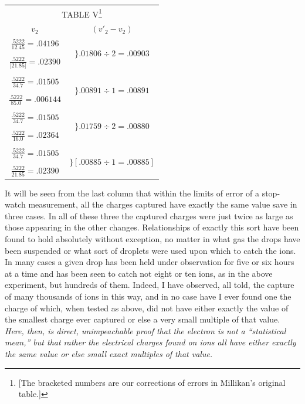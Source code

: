 \begin{table}[htp]
\centering
\begin{minipage}{\textwidth}
\centering
\begin{tabular}{ c c }
  \multicolumn{2}{c}{TABLE V\footnote{[The bracketed numbers are our corrections of errors
  in Millikan's original table.]}}\\[3pt]
  $v_2$ & $ (v'_2 - v_2)$\\[5pt]
  $\frac{.5222}{12.45} = .04196$ & \multirow{3}{*}{$\biggr\} .01806 \div 2 = .00903$}\\
  &\\
  $\frac{.5222}{{[}21.85{]}} = .02390$ & \multirow{3}{*}{$\biggr\} .00885 \div 1 = .00885$}\\
  &\\
  $\frac{.5222}{34.7} = .01505$ &\multirow{3}{*}{$\biggr\} .00891 \div 1 = .00891$}\\
  &\\
  $\frac{.5222}{85.0} = .006144$ &\multirow{3}{*}{$\biggr\} .00891 \div 1 = .00891$}\\
  &\\
  $\frac{.5222}{34.7} = .01505$ &\multirow{3}{*}{$\biggr\} .01759 \div 2 = .00880$}\\
  &\\
  $\frac{.5222}{16.0} = .02364$ &\multirow{3}{*}{$\biggr\} .01759 \div 2 = .00880$}\\
  &\\
  $\frac{.5222}{34.7} = .01505$ &\multirow{3}{*}{$\biggr\} [.00885 \div 1 = .00885]$}\\
  &\\
  $\frac{.5222}{21.85} = .02390$ &\\
\end{tabular}
\end{minipage}
\end{table}

It will be seen from the last column that within the limits of error of
a stop-watch measurement, all the charges captured have exactly the same
value save in three cases. In all of these three the captured charges
were just twice as large as those appearing in the other changes.
Relationships of exactly this sort have been found to hold absolutely
without exception, no matter in what gas the drops have been suspended
or what sort of droplets were used upon which to catch the ions. In many
cases a given drop has been held under observation for five or six hours
at a time and has been seen to catch not eight or ten ions, as in the
above experiment, but hundreds of them. Indeed, I have observed, all
told, the capture of many thousands of ions in this way, and in no case
have I ever found one the charge of which, when tested as above, did not
have either exactly the value of the smallest charge ever captured or
else a very small multiple of that value. \emph{Here, then, is direct,
unimpeachable proof that the electron is not a ``statistical mean,'' but
that rather the electrical charges found on ions all have either exactly
the same value or else small exact multiples of that value.}

